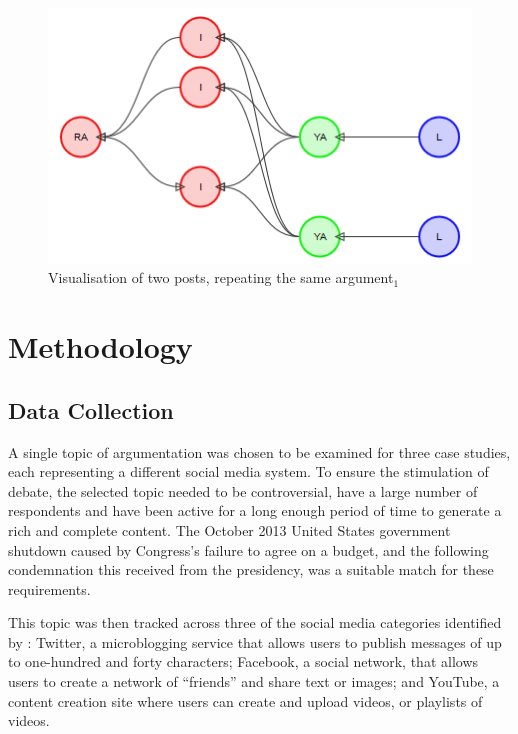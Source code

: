 \begin{figure}
\centering
\includegraphics[scale=0.5]{./figures/graphs/aswo-repeated-argument.png}
\caption{Visualisation of two posts, repeating the same argument$_1$}
\label{figure:graphs:aswo-repeated-argument}
\end{figure}


\section{Methodology}

\subsection{Data Collection}
\label{investigation:methodology:datacollection}
A single topic of argumentation was chosen to be examined for three case studies, each representing a different social media system. To ensure the stimulation of debate, the selected topic needed to be controversial, have a large number of respondents and have been active for a long enough period of time to generate a rich and complete content. The October 2013 United States government shutdown caused by Congress's failure to agree on a budget, and the following condemnation this received from the presidency, was a suitable match for these requirements. 

This topic was then tracked across three of the social media categories identified by \citet{Kaplan2010}: Twitter, a microblogging service that allows users to publish messages of up to one-hundred and forty characters; Facebook, a social network, that allows users to create a network of ``friends'' and share text or images; and YouTube, a content creation site where users can create and upload videos, or playlists of videos.

